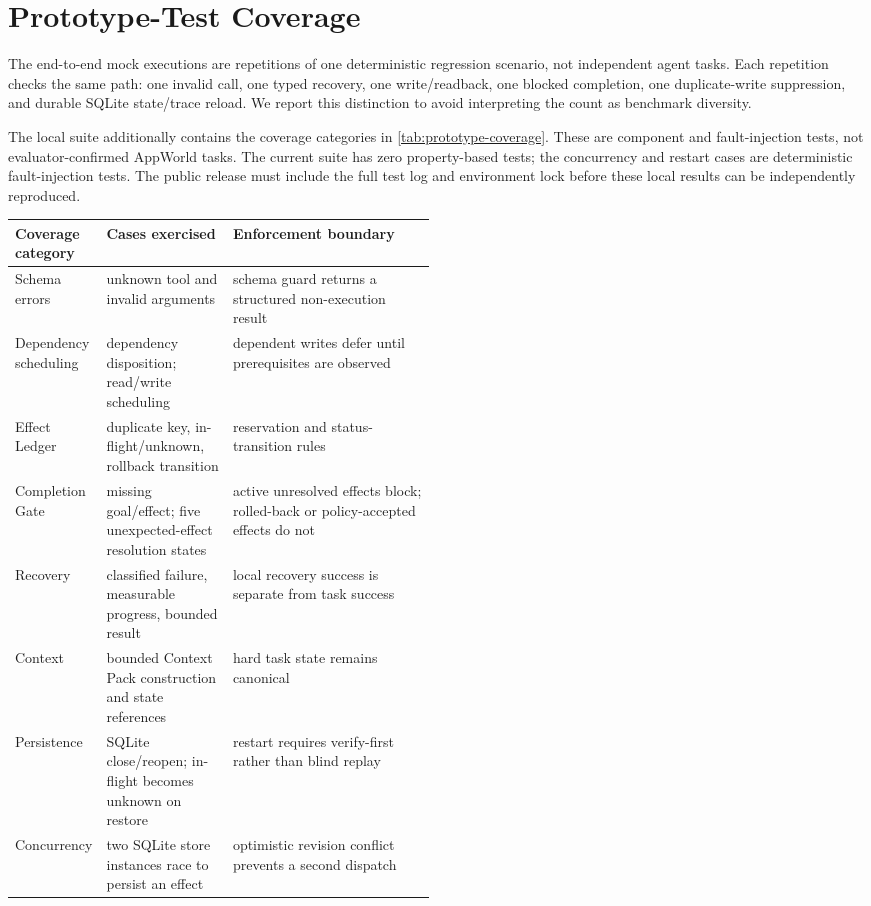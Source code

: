 \section{Prototype-Test Coverage}
\label{app:prototype-tests}

The \PrototypeValidationRepetitionCount{} end-to-end mock executions are
repetitions of one deterministic regression scenario, not \PrototypeValidationRepetitionCount{}
independent agent tasks. Each repetition checks the same path: one invalid call,
one typed recovery, one write/readback, one blocked completion, one duplicate-write
suppression, and durable SQLite state/trace reload. We report this distinction to
avoid interpreting the count as benchmark diversity.

The local suite additionally contains the coverage categories in
\cref{tab:prototype-coverage}. These are component and fault-injection tests, not
evaluator-confirmed AppWorld tasks. The current suite has zero property-based tests;
the concurrency and restart cases are deterministic fault-injection tests. The
public release must include the full test log and environment lock before these
local results can be independently reproduced.

\begin{center}
\small
\begin{tabularx}{\linewidth}{@{}p{0.19\linewidth}p{0.30\linewidth}Y@{}}
\toprule
Coverage category & Cases exercised & Enforcement boundary \\
\midrule
Schema errors & unknown tool and invalid arguments & schema guard returns a structured non-execution result \\
Dependency scheduling & dependency disposition; read/write scheduling & dependent writes defer until prerequisites are observed \\
Effect Ledger & duplicate key, in-flight/unknown, rollback transition & reservation and status-transition rules \\
Completion Gate & missing goal/effect; five unexpected-effect resolution states & active unresolved effects block; rolled-back or policy-accepted effects do not \\
Recovery & classified failure, measurable progress, bounded result & local recovery success is separate from task success \\
Context & bounded Context Pack construction and state references & hard task state remains canonical \\
Persistence & SQLite close/reopen; in-flight becomes unknown on restore & restart requires verify-first rather than blind replay \\
Concurrency & two SQLite store instances race to persist an effect & optimistic revision conflict prevents a second dispatch \\
\bottomrule
\end{tabularx}
\label{tab:prototype-coverage}
\end{center}

